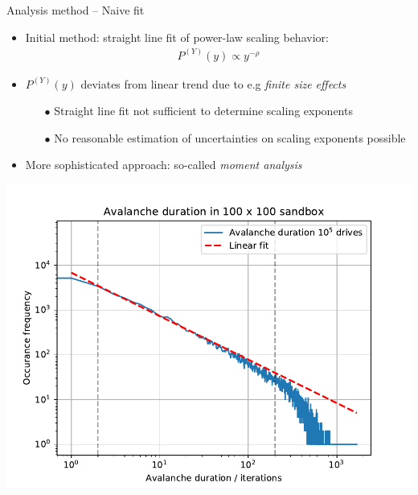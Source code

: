\documentclass[xcolor=dvipsnames]{beamer}
\begin{document}
    \begin{frame}{Analysis method -- Naive fit}
    	\begin{itemize}
    		\item {Initial method: straight line fit of power-law scaling behavior:
    			\begin{align*}
    			P^{(Y)}(y) \propto y^{-\rho}
    			\end{align*}}
    	\end{itemize}
    	\begin{minipage}[l]{0.5\textwidth}
    		\begin{itemize}
    			\item<2-> {$P^{(Y)}(y)$ deviates from linear trend due to e.g \textit{finite size effects}
    				\begin{itemize}
    					\item[$\bullet$] Straight line fit not sufficient to determine scaling exponents
    					\item[$\bullet$] No reasonable estimation of uncertainties on scaling exponents possible 
    				\end{itemize}}
    			\item<2->[$\Rightarrow$] More sophisticated approach: so-called \textit{moment analysis}
    		\end{itemize}
    	\end{minipage}
    	\begin{minipage}[r]{0.475\textwidth}
    			\centering
    			\includegraphics[width=\textwidth]{naive_fit.pdf}
    	\end{minipage}
    \end{frame}
    
\end{document}

